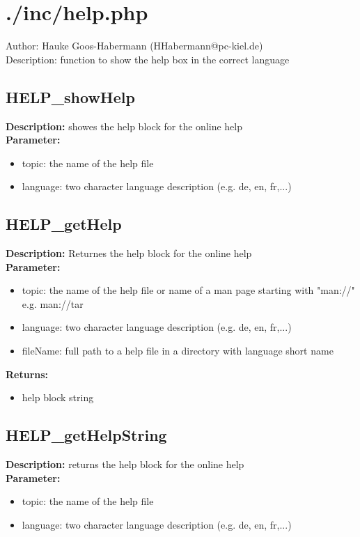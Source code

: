 \newpage\section{./inc/help.php}
 Author: Hauke Goos-Habermann (HHabermann@pc-kiel.de)\\
 Description: function to show the help box in the correct language\\

\subsection{HELP\_showHelp}
\textbf{Description:} showes the help block for the online help\\
\textbf{Parameter:}
\begin{itemize}
\item topic: the name of the help file
\item language: two character language description (e.g. de, en, fr,...)
\end{itemize}

\subsection{HELP\_getHelp}
\textbf{Description:} Returnes the help block for the online help\\
\textbf{Parameter:}
\begin{itemize}
\item topic: the name of the help file or name of a man page starting with "man://" e.g. man://tar
\item language: two character language description (e.g. de, en, fr,...)
\item fileName: full path to a help file in a directory with language short name
\end{itemize}
\textbf{Returns:}
\begin{itemize}
\item help block string
\end{itemize}

\subsection{HELP\_getHelpString}
\textbf{Description:} returns the help block for the online help\\
\textbf{Parameter:}
\begin{itemize}
\item topic: the name of the help file
\item language: two character language description (e.g. de, en, fr,...)
\end{itemize}

